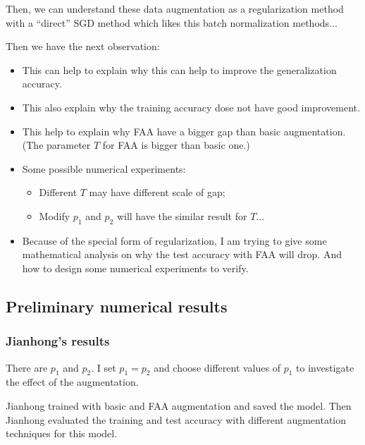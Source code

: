Then, we can understand these data augmentation as a regularization method with a ``direct'' SGD method which likes this batch normalization methods...

Then we have the next observation:
\begin{itemize}
	\item This can help to explain why this can help to improve the generalization accuracy.
	\item This also explain why the training accuracy dose not have good improvement.
	\item This help to explain why FAA have a bigger gap than basic augmentation. (The parameter $T$ for FAA is bigger than basic one.)
	\item Some possible numerical experiments:
	\begin{itemize}
		\item Different $T$ may have different scale of gap;
		\item Modify $p_1$ and $p_2$ will have the similar result for $T$...
	\end{itemize}
	\item Because of the special form of regularization, I am trying to give some mathematical analysis on why the test accuracy
	with FAA will drop. And how to design some numerical experiments to verify. 
\end{itemize}



\subsection{Preliminary numerical results}

\subsubsection{Jianhong's results}
There are $p_1$ and $p_2$. I set $p_1=p_2$ and choose different values of $p_1$ to investigate the effect of the augmentation. 

Jianhong trained with basic and FAA augmentation and saved the model. Then Jianhong evaluated the training and test accuracy with different augmentation techniques for this model. 



